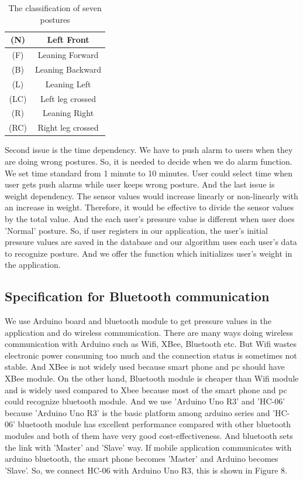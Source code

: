 \documentclass[conference]{IEEEtran}
\begin{document}
 \begin{table}[h]
{\renewcommand\arraystretch{1.25}
\caption{The classification of seven postures}
\begin{tabular}{|c|cc}  \hline\hline
(N)& \multicolumn{2}{p{7cm}|}{\raggedright Left Front} \\ \hline
(F)& \multicolumn{2}{p{7cm}|}{\raggedright Leaning Forward} \\ \hline
(B)& \multicolumn{2}{p{7cm}|}{\raggedright Leaning Backward} \\ \hline
(L)& \multicolumn{2}{p{7cm}|}{\raggedright Leaning Left} \\ \hline
(LC)& \multicolumn{2}{p{7cm}|}{\raggedright Left leg crossed} \\ \hline 
(R)& \multicolumn{2}{p{7cm}|}{\raggedright Leaning Right} \\ \hline
(RC)& \multicolumn{2}{p{7cm}|}{\raggedright Right leg crossed} \\ \hline \hline
\end{tabular}}
\end{table}



Second issue is the time dependency. We have to push alarm to users when they are doing wrong postures. So, it is needed to decide when we do alarm function. We set time standard from 1 minute to 10 minutes. User could select time when user gets push alarms while user keeps wrong posture. 
   And the last issue is weight dependency. The sensor values would increase linearly or non-linearly with an increase in weight. Therefore, it would be effective to divide the sensor values by the total value. And the each user's pressure value is different when user does 'Normal' posture. So, if user registers in our application, the user's initial pressure values are saved in the database and our algorithm uses each user's data to recognize posture. And we offer the function which initializes user's weight in the application. 
\subsection{Specification for Bluetooth communication}

We use Arduino board and bluetooth module to get pressure values in the application and do wireless communication. There are many ways doing wireless communication with Arduino such as Wifi, XBee, Bluetooth etc. But Wifi wastes electronic power consuming too much and the connection status is sometimes not stable. And XBee is not widely used because smart phone and pc should have XBee module. On the other hand, Bluetooth module is cheaper than Wifi module and is widely used compared to Xbee because most of the smart phone and pc could recognize bluetooth module. And we use 'Arduino Uno R3' and 'HC-06' because 'Arduino Uno R3' is the basic platform among arduino series and 'HC-06' bluetooth module has excellent performance compared with other bluetooth modules and both of them have very good cost-effectiveness. And bluetooth sets the link with 'Master' and 'Slave' way. If mobile application communicates with arduino bluetooth, the smart phone becomes 'Master' and Arduino becomes 'Slave'. So, we connect HC-06 with Arduino Uno R3, this is shown in Figure 8.
\end{document}

